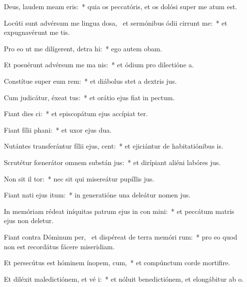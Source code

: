 \item Deus, laudem meam  eris:~* quia os peccatóris, et os dolósi super me atum est.
\item Locúti sunt advérsum me lingua dosa,~\pscross{} et sermónibus ódii cirrunt me:~* et expugnavérunt me tis.
\item Pro eo ut me dilígerent, detra hi:~* ego autem obam.
\item Et posuérunt advérsum me ma  nis:~* et ódium pro dilectióne a.
\item Constítue super eum rem:~* et diábolus stet a dextris jus.
\item Cum judicátur, éxeat tus:~* et orátio ejus fiat in pectum.
\item Fiant dies  ci:~* et episcopátum ejus accípiat ter.
\item Fiant fílii  phani:~* et uxor ejus dua.
\item Nutántes transferántur fílii ejus,  cent:~* et ejiciántur de habitatiónibus is.
\item Scrutétur fœnerátor omnem substán jus:~* et dirípiant aliéni labóres jus.
\item Non sit il tor:~* nec sit qui misereátur pupíllis jus.
\item Fiant nati ejus  itum:~* in generatióne una deleátur nomen jus.
\item In memóriam rédeat iníquitas patrum ejus in con mini:~* et peccátum matris ejus non deletur.
\item Fiant contra Dóminum per,~\pscross{} et dispéreat de terra memóri rum:~* pro eo quod non est recordátus fácere miseridiam.
\item Et persecútus est hóminem ínopem,  cum,~* et compúnctum corde mortifire.
\item Et diléxit maledictiónem, et vé i:~* et nóluit benedictiónem, et elongábitur ab o.
